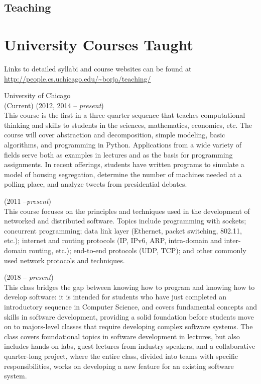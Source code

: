 \documentclass{resume}
\begin{document}
\pagebreak

\begin{center}
\section*{\huge Teaching}
\vspace{2ex}
\end{center}

\section*{\hspace{-1cm}University Courses Taught}

Links to detailed syllabi and course websites can be found at \url{http://people.cs.uchicago.edu/~borja/teaching/}

\begin{category}{University of Chicago\\(Current)} 
 (2012, 2014 -- \emph{present})\\
This course is the first in a three-quarter sequence that teaches computational thinking and skills to students in the sciences, mathematics, economics, etc. The course will cover abstraction and decomposition, simple modeling, basic algorithms, and programming in Python. Applications from a wide variety of fields serve both as examples in lectures and as the basis for programming assignments. In recent offerings, students have written programs to simulate a model of housing segregation, determine the number of machines needed at a polling place, and analyze tweets from presidential debates.

 (2011 --\emph{present})\\
This course focuses on the principles and techniques used in the development of networked and distributed software. Topics include programming with sockets; concurrent programming; data link layer (Ethernet, packet switching, 802.11, etc.); internet and routing protocols (IP, IPv6, ARP, intra-domain and inter-domain routing, etc.); end-to-end protocols (UDP, TCP); and other commonly used network protocols and techniques.

 (2018 -- \emph{present})\\
This class bridges the gap between knowing how to program and knowing how to develop software: it is intended for students who have just completed an introductory sequence in Computer Science, and covers fundamental concepts and skills in software development, providing a solid foundation before students move on to majors-level classes that require developing complex software systems. The class covers foundational topics in software development in lectures, but also includes hands-on labs, guest lectures from industry speakers, and a collaborative quarter-long project, where the entire class, divided into teams with specific responsibilities, works on developing a new feature for an existing software system.
\end{category}
\end{document}
